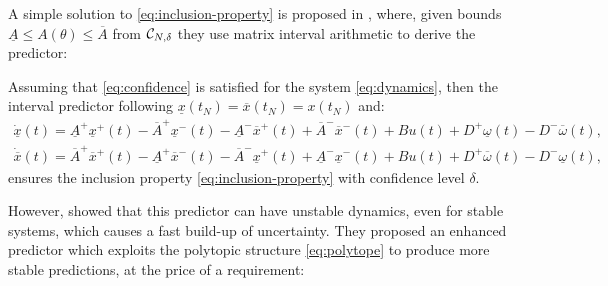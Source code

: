\documentclass{article}
\begin{document}
A simple solution to \eqref{eq:inclusion-property} is proposed in \citep{Efimov2012}, where, given bounds $\underline{A}\leq A(\theta)\leq\overline{A}$ from $\mathcal{C}_{N,\delta}$ they use matrix interval arithmetic to derive the predictor:
\begin{proposition}
Assuming that \eqref{eq:confidence} is satisfied for the system \eqref{eq:dynamics}, then the interval predictor following $\underline{x}(t_N)=\overline{x}(t_N)={x}(t_N)$ and:
\begin{eqnarray}
\dot{\underline{x}}(t) = \underline{A}^{+}\underline{x}^{+}(t)-\overline{A}^{+}\underline{x}^{-}(t)-\underline{A}^{-}\overline{x}^{+}(t) +\overline{A}^{-}\overline{x}^{-}(t) +Bu(t) + D^{+}\underline{\omega}(t)-D^{-}\overline{\omega}(t),\label{eq:predictor-naive}\\
\dot{\overline{x}}(t) = \overline{A}^{+}\overline{x}^{+}(t)-\underline{A}^{+}\overline{x}^{-}(t)-\overline{A}^{-}\underline{x}^{+}(t)+\underline{A}^{-}\underline{x}^{-}(t)\nonumber+Bu(t) + D^{+}\overline{\omega}(t)-D^{-}\underline{\omega}(t),\nonumber
\end{eqnarray}
ensures the inclusion property \eqref{eq:inclusion-property} with confidence level $\delta$.
\end{proposition}

However, \citet{leurent2019interval} showed that this predictor can have unstable dynamics, even for stable systems, which causes a fast build-up of uncertainty. They proposed an enhanced predictor which exploits the polytopic structure \eqref{eq:polytope} to produce more stable predictions, at the price of a requirement:
\end{document}
